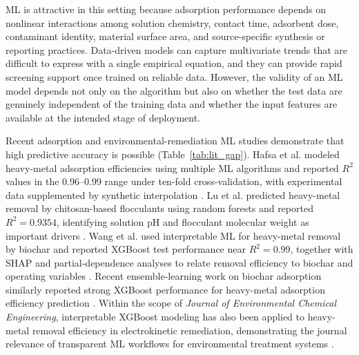 \documentclass[review,12pt,number]{elsarticle}
\begin{document}
ML is attractive in this setting because adsorption performance depends on nonlinear interactions among solution chemistry, contact time, adsorbent dose, contaminant identity, material surface area, and source-specific synthesis or reporting practices. Data-driven models can capture multivariate trends that are difficult to express with a single empirical equation, and they can provide rapid screening support once trained on reliable data. However, the validity of an ML model depends not only on the algorithm but also on whether the test data are genuinely independent of the training data and whether the input features are available at the intended stage of deployment.

Recent adsorption and environmental-remediation ML studies demonstrate that high predictive accuracy is possible (Table~\ref{tab:lit_gap}). Hafsa et al. modeled heavy-metal adsorption efficiencies using multiple ML algorithms and reported $R^2$ values in the 0.96--0.99 range under ten-fold cross-validation, with experimental data supplemented by synthetic interpolation \cite{hafsa2020}. Lu et al. predicted heavy-metal removal by chitosan-based flocculants using random forests and reported $R^2 = 0.9354$, identifying solution pH and flocculant molecular weight as important drivers \cite{lu2022}. Wang et al. used interpretable ML for heavy-metal removal by biochar and reported XGBoost test performance near $R^2 = 0.99$, together with SHAP and partial-dependence analyses to relate removal efficiency to biochar and operating variables \cite{wang2024,lundberg2017}. Recent ensemble-learning work on biochar adsorption similarly reported strong XGBoost performance for heavy-metal adsorption efficiency prediction \cite{yaseen2025}. Within the scope of \textit{Journal of Environmental Chemical Engineering}, interpretable XGBoost modeling has also been applied to heavy-metal removal efficiency in electrokinetic remediation, demonstrating the journal relevance of transparent ML workflows for environmental treatment systems \cite{barkhordari2024}.
\end{document}
